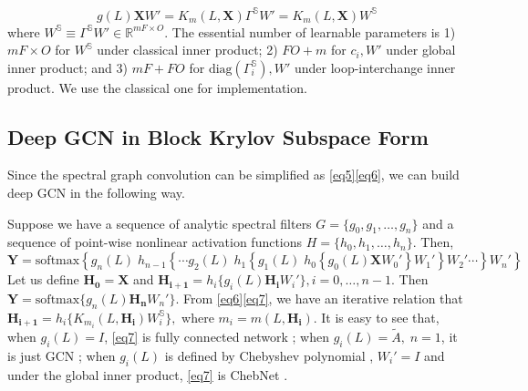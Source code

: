 \documentclass{article}
\begin{document}
\begin{equation} \label{eq6}
g(L)\bm{X}W' =  K_m (L,\bm{X}) \Gamma^{\mathbb{S}} W' =  K_m (L,\bm{X}) W^{\mathbb{S}}
\end{equation}
where $W^{\mathbb{S}} \equiv \Gamma^{\mathbb{S}} W' \in \mathbb{R}^{mF \times O}$. The essential  number of learnable parameters is 1) $mF\times O$ for $W^{\mathbb{S}}$ under classical inner product; 2) $FO+m$  for $c_i,W'$ under global inner product; and 3) $mF + FO$ for  $\text{diag}(\Gamma_i^{\mathbb{S}}),W'$ under loop-interchange inner product. We use the classical one for implementation.
\subsection{Deep GCN in Block Krylov Subspace Form}
\label{deep_gcn_krylov}
Since the spectral graph convolution can be simplified as \eqref{eq5}\eqref{eq6}, we can build deep GCN in the following way.
	
Suppose we have a sequence of analytic spectral filters $G=\{ g_0, g_1, \dots, g_n\}$ and a sequence of point-wise nonlinear activation functions $H = \{h_0, h_1,\dots, h_n \}$. Then,
\begin{equation} \label{eq7}
\textbf{Y} = \mbox{softmax} \left\lbrace g_n(L) \; h_{n-1} \left\lbrace  \cdots g_2(L) \; h_1\left\lbrace g_1(L) \; h_0 \left\{ g_0(L) \bm{X} W_0' \right\} W_1' \right\rbrace  W_2' \cdots \right\rbrace W_n' \right\rbrace
\end{equation}
Let us define $\bm{H_0}=\bm{X}$ and $\bm{H_{i+1}}=h_{i} \{ g_i(L) \bm{H_i} W_i'\}, i = 0,\dots,n-1$. Then $\bm{Y}=\mbox{softmax}\{ g_n(L)\bm{H_n} W_n' \}$. From \eqref{eq6}\eqref{eq7}, we have an iterative relation that $\bm{H_{i+1}} = h_{i} \{K_{m_i} (L,\bm{H_i}) W_i^{\mathbb{S}}\},$ where $m_i = m(L,\bm{H_i})$. It is easy to see that, when $g_i(L) = I$, \eqref{eq7} is fully connected network \cite{li2018deeper}; when $g_i(L) = \tilde{A}, \; n=1$, it is just GCN \cite{kipf2016classification}; when $g_i(L)$ is defined by Chebyshev polynomial \cite{hammond2011wavelets}, $W_i' = I$ and under the global inner product, \eqref{eq7} is ChebNet \cite{defferrard2016fast}.
\end{document}
